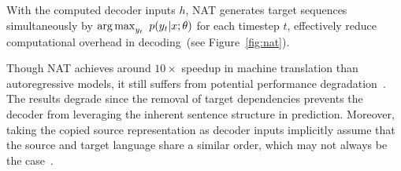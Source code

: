 With the computed decoder inputs $h$, NAT generates target sequences simultaneously by $\operatorname*{arg\,max}_{y_t}\ p(y_t|x; \theta)$ for each timestep $t$, effectively reduce computational overhead in decoding~(see Figure~\ref{fig:nat}). 

Though NAT achieves around $10\times$ speedup in machine translation than autoregressive models, it still suffers from potential performance degradation~\citep{nat}.
The results degrade since the removal of target dependencies prevents the decoder from leveraging the inherent sentence structure in prediction.
Moreover, taking the copied source representation as decoder inputs implicitly assume that the source and target language share a similar order, which may not always be the case~\cite{pnat}.

